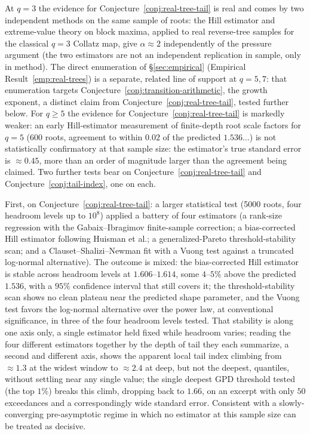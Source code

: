 \documentclass[11pt]{article}
\theoremstyle{remark}
\begin{document}
At $q=3$ the evidence for Conjecture~\ref{conj:real-tree-tail} is real
and comes by two independent methods on the same sample of roots: the
Hill estimator and extreme-value theory on block maxima, applied to
real reverse-tree samples for the classical $q=3$ Collatz map, give
$\alpha\approx2$ independently of the pressure argument (the two
estimators are not an independent replication in sample, only in
method). The direct enumeration of \S\ref{sec:empirical}
(Empirical Result~\ref{emp:real-trees}) is a separate, related line of
support at $q=5,7$: that enumeration targets
Conjecture~\ref{conj:transition-arithmetic}, the growth exponent, a
distinct claim from Conjecture~\ref{conj:real-tree-tail}, tested
further below. For $q\ge5$ the evidence for
Conjecture~\ref{conj:real-tree-tail} is markedly weaker: an early
Hill-estimator measurement of finite-depth root scale factors for
$q=5$ (600
roots, agreement to within $0.02$ of the predicted
$1.536\ldots$) is not statistically confirmatory at that sample size:
the estimator's true standard error is $\approx0.45$, more than an order of
magnitude larger than the agreement being claimed. Two further tests
bear on
Conjecture~\ref{conj:real-tree-tail} and Conjecture~\ref{conj:tail-index},
one on each.

First, on Conjecture~\ref{conj:real-tree-tail}: a larger statistical
test (5000 roots, four
headroom levels up to $10^8$) applied a battery of four estimators (a
rank-size regression with the Gabaix--Ibragimov finite-sample
correction; a bias-corrected Hill estimator following Huisman et al.;
a generalized-Pareto threshold-stability scan; and a
Clauset--Shalizi--Newman fit with a Vuong test against a truncated
log-normal alternative). The outcome is mixed:
the bias-corrected Hill estimator is stable across headroom
levels at $1.606$--$1.614$, some $4$--$5\%$ above the predicted
$1.536$, with a $95\%$ confidence interval that still covers it; the
threshold-stability scan shows no clean plateau near the predicted
shape parameter, and the Vuong test favors the log-normal alternative
over the power law, at conventional significance, in three of the four
headroom levels tested. That stability is along one axis only, a
single estimator held fixed while headroom varies; reading the four
different estimators together by the depth of tail they each
summarize, a second and different axis, shows the apparent local tail
index climbing from $\approx1.3$ at the widest window to
$\approx2.4$ at deep, but not the deepest, quantiles, without settling
near any single value; the single deepest GPD threshold tested
(the top $1\%$) breaks this climb, dropping back to $1.66$, on an
excerpt with only $50$ exceedances and a correspondingly wide standard
error. Consistent with a slowly-converging pre-asymptotic regime in
which no estimator at this sample size can be treated as decisive.
\end{document}
